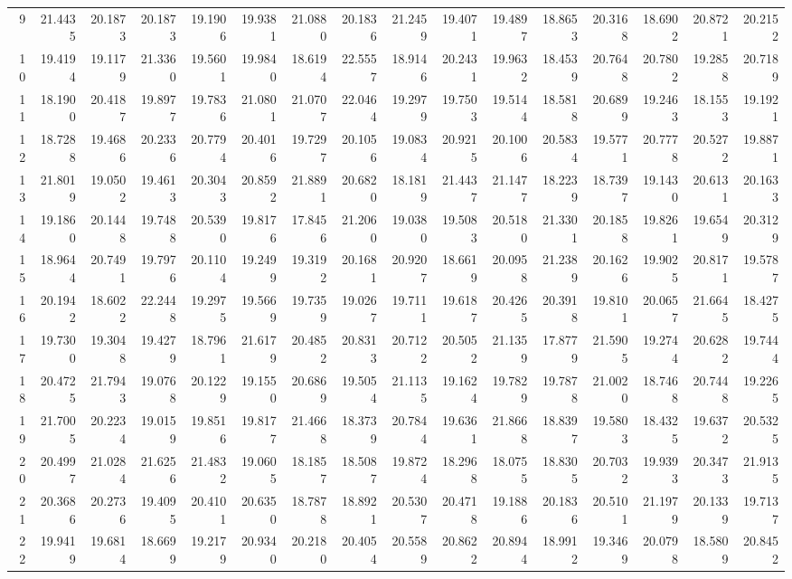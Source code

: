 \documentclass[12pt]{article}\usepackage[]{graphicx}\usepackage[]{color}
\begin{document}
\begin{landscape}
\begin{longtable}[t]{rrrrrrrrrrrrrrrr}
9 & 21.4435 & 20.1873 & 20.1873 & 19.1906 & 19.9381 & 21.0880 & 20.1836 & 21.2459 & 19.4071 & 19.4897 & 18.8653 & 20.3168 & 18.6902 & 20.8721 & 20.2152\\
10 & 19.4194 & 19.1179 & 21.3360 & 19.5601 & 19.9840 & 18.6194 & 22.5557 & 18.9146 & 20.2431 & 19.9632 & 18.4539 & 20.7648 & 20.7802 & 19.2858 & 20.7189\\
11 & 18.1900 & 20.4187 & 19.8977 & 19.7836 & 21.0801 & 21.0707 & 22.0464 & 19.2979 & 19.7503 & 19.5144 & 18.5818 & 20.6899 & 19.2463 & 18.1553 & 19.1921\\
12 & 18.7288 & 19.4686 & 20.2336 & 20.7794 & 20.4016 & 19.7297 & 20.1056 & 19.0834 & 20.9215 & 20.1006 & 20.5834 & 19.5771 & 20.7778 & 20.5272 & 19.8871\\
13 & 21.8019 & 19.0502 & 19.4613 & 20.3043 & 20.8592 & 21.8891 & 20.6820 & 18.1819 & 21.4437 & 21.1477 & 18.2239 & 18.7397 & 19.1430 & 20.6131 & 20.1633\\
14 & 19.1860 & 20.1448 & 19.7488 & 20.5390 & 19.8176 & 17.8456 & 21.2060 & 19.0380 & 19.5083 & 20.5180 & 21.3301 & 20.1858 & 19.8261 & 19.6549 & 20.3129\\
15 & 18.9644 & 20.7491 & 19.7976 & 20.1104 & 19.2499 & 19.3192 & 20.1681 & 20.9207 & 18.6619 & 20.0958 & 21.2389 & 20.1626 & 19.9025 & 20.8171 & 19.5787\\
16 & 20.1942 & 18.6022 & 22.2448 & 19.2975 & 19.5669 & 19.7359 & 19.0267 & 19.7111 & 19.6187 & 20.4265 & 20.3918 & 19.8101 & 20.0657 & 21.6645 & 18.4275\\
17 & 19.7300 & 19.3048 & 19.4279 & 18.7961 & 21.6179 & 20.4852 & 20.8313 & 20.7122 & 20.5052 & 21.1359 & 17.8779 & 21.5905 & 19.2744 & 20.6282 & 19.7444\\
18 & 20.4725 & 21.7943 & 19.0768 & 20.1229 & 19.1550 & 20.6869 & 19.5054 & 21.1135 & 19.1624 & 19.7829 & 19.7878 & 21.0020 & 18.7468 & 20.7448 & 19.2265\\
19 & 21.7005 & 20.2234 & 19.0159 & 19.8516 & 19.8177 & 21.4668 & 18.3739 & 20.7844 & 19.6361 & 21.8668 & 18.8397 & 19.5803 & 18.4325 & 19.6372 & 20.5325\\
20 & 20.4997 & 21.0284 & 21.6256 & 21.4832 & 19.0605 & 18.1857 & 18.5087 & 19.8724 & 18.2968 & 18.0755 & 18.8305 & 20.7032 & 19.9393 & 20.3473 & 21.9135\\
21 & 20.3686 & 20.2736 & 19.4095 & 20.4101 & 20.6350 & 18.7878 & 18.8921 & 20.5307 & 20.4718 & 19.1886 & 20.1836 & 20.5101 & 21.1979 & 20.1339 & 19.7137\\
22 & 19.9419 & 19.6814 & 18.6699 & 19.2179 & 20.9340 & 20.2180 & 20.4054 & 20.5589 & 20.8622 & 20.8944 & 18.9912 & 19.3469 & 20.0798 & 18.5809 & 20.8452\\

\end{longtable}
\end{landscape}
\end{document}
